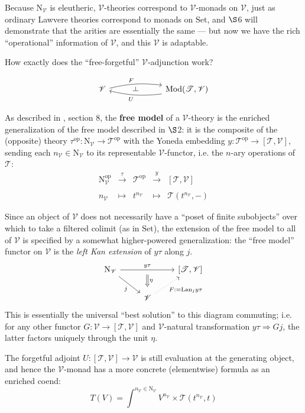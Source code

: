 \documentclass{amsart}
\theoremstyle{definition}
\def\ld{\rotatebox[origin=c]{-90}{$\dashv$}} %
\newcommand{\Set}{\mathrm{Set}}
\newcommand{\Mod}{\mathrm{Mod}}
\newcommand{\op}{\mathrm{op}}
\newcommand{\NN}{\mathrm{N}}
\newcommand{\V}{\mathscr{V}}
\newcommand{\T}{\mathscr{T}}
\newcommand{\maps}{\colon}
\begin{document}
Because $\NN_\V$ is eleutheric, $\V$-theories correspond to $\V$-monads on $\V$, just as ordinary Lawvere theories correspond to monads on $\Set$, and $\S$6 will demonstrate that the arities are essentially the same --- but now we have the rich ``operational'' information of $\V$, and this $\V$ is adaptable.

How exactly does the ``free-forgetful'' $\V$-adjunction work?

\[\begin{tikzcd}
\V \arrow[bend left=10,below]{rr}{F}
& \ld &
\arrow[bend left=10,above]{ll}{U} \Mod(\T,\V)
\end{tikzcd}\]

As described in \cite{rbb}, section 8, the \textbf{free model} of a $\V$-theory is the enriched generalization of the free model described in $\S$2: it is the composite of the (opposite) theory $\tau^\op\maps \NN_\V \to \T^\op$ with the Yoneda embedding $y\maps \T^\op \to [\T,\V]$, sending each $n_\V \in \NN_\V$ to its representable $\V$-functor, i.e. the $n$-ary operations of $\T$:
\[\begin{array}{rllll}
\NN_\V^\op & \xrightarrow{\tau} & \T^\op & \xrightarrow{y} & \left[\T,\V\right]\\
\\
n_\V & \mapsto & t^{n_\V} & \mapsto & \T(t^{n_\V},-)
\end{array}\]

Since an object of $\V$ does not necessarily have a ``poset of finite subobjects'' over which to take a filtered colimit (as in $\Set$), the extension of the free model to all of $\V$ is specified by a somewhat higher-powered generalization: the ``free model'' functor on $\V$ is the \textit{left Kan extension} of $y\tau$ along $j$.
\[\begin{tikzcd}
\NN_\V \arrow[rr,"y\tau"{name=y}] \arrow[swap,rd,"j"] & & \left[\T,\V\right]\\
& \V \arrow[swap,dotted, ru,"F:=\mathrm{Lan}_jy\tau"] \arrow[Rightarrow,from=y,"\eta", shorten >=0.2cm,shorten <=.2cm]
\end{tikzcd}\]
This is essentially the universal ``best solution'' to this diagram commuting; i.e. for any other functor $G: \V \to [\T,\V]$ and $\V$-natural transformation $y\tau \Rightarrow Gj$, the latter factors uniquely through the unit $\eta$.

The forgetful adjoint $U\maps [\T,\V] \to \V$ is still evaluation at the generating object, and hence the $\V$-monad has a more concrete (elementwise) formula as an enriched coend:
\begin{equation}
T(V) = \int^{n_\V\in \NN_\V} V^{n_\V} \times \T(t^{n_\V},t)
\end{equation}
\end{document}
